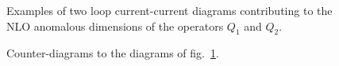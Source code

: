 \documentclass[12pt,rotate]{article}
\begin{document}
\begin{itemize}
\begin{itemize}
\begin{itemize}
\begin{figure}[hbt]
\vspace{0.10in}
\centerline{
\epsfysize=2in
}%
\vspace{0.08in}
\caption[]{Examples of two loop current-current diagrams
contributing to the NLO anomalous dimensions of the operators $Q_1$ and 
$Q_2$.
\label{L:5}}
\end{figure}

\begin{figure}[hbt]
\vspace{0.10in}
\centerline{
\epsfysize=2in
}%
\vspace{0.08in}
\caption[]{Counter-diagrams to the diagrams of fig.~\ref{L:5}.
\label{L:6}}
\end{figure}


\end{itemize}
\end{itemize}
\end{itemize}
\end{document}
